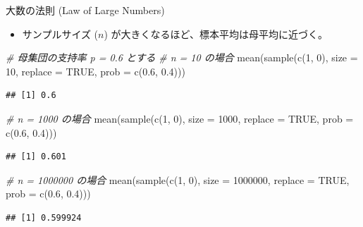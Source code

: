 \documentclass[
  ignorenonframetext,
]{beamer}
\newenvironment{Shaded}{\begin{snugshade}}{\end{snugshade}}
\newcommand{\AttributeTok}[1]{\textcolor[rgb]{0.77,0.63,0.00}{#1}}
\newcommand{\CommentTok}[1]{\textcolor[rgb]{0.56,0.35,0.01}{\textit{#1}}}
\newcommand{\ConstantTok}[1]{\textcolor[rgb]{0.00,0.00,0.00}{#1}}
\newcommand{\DecValTok}[1]{\textcolor[rgb]{0.00,0.00,0.81}{#1}}
\newcommand{\FloatTok}[1]{\textcolor[rgb]{0.00,0.00,0.81}{#1}}
\newcommand{\FunctionTok}[1]{\textcolor[rgb]{0.00,0.00,0.00}{#1}}
\newcommand{\NormalTok}[1]{#1}
\providecommand{\tightlist}{%
  \setlength{\itemsep}{0pt}\setlength{\parskip}{0pt}}
\begin{document}
\begin{frame}[fragile]{大数の法則 (Law of Large Numbers)}
\protect\hypertarget{ux5927ux6570ux306eux6cd5ux5247-law-of-large-numbers}{}
\begin{itemize}
\tightlist
\item
  サンプルサイズ (\(n\)) が大きくなるほど、標本平均は母平均に近づく。
\end{itemize}

\scriptsize

\begin{Shaded}
\begin{Highlighting}[]
\CommentTok{\# 母集団の支持率 p = 0.6 とする}
\CommentTok{\# n = 10 の場合}
\FunctionTok{mean}\NormalTok{(}\FunctionTok{sample}\NormalTok{(}\FunctionTok{c}\NormalTok{(}\DecValTok{1}\NormalTok{, }\DecValTok{0}\NormalTok{), }\AttributeTok{size =} \DecValTok{10}\NormalTok{, }\AttributeTok{replace =} \ConstantTok{TRUE}\NormalTok{, }
            \AttributeTok{prob =} \FunctionTok{c}\NormalTok{(}\FloatTok{0.6}\NormalTok{, }\FloatTok{0.4}\NormalTok{)))}
\end{Highlighting}
\end{Shaded}

\begin{verbatim}
## [1] 0.6
\end{verbatim}

\begin{Shaded}
\begin{Highlighting}[]
\CommentTok{\# n = 1000 の場合}
\FunctionTok{mean}\NormalTok{(}\FunctionTok{sample}\NormalTok{(}\FunctionTok{c}\NormalTok{(}\DecValTok{1}\NormalTok{, }\DecValTok{0}\NormalTok{), }\AttributeTok{size =} \DecValTok{1000}\NormalTok{, }\AttributeTok{replace =} \ConstantTok{TRUE}\NormalTok{,}
            \AttributeTok{prob =} \FunctionTok{c}\NormalTok{(}\FloatTok{0.6}\NormalTok{, }\FloatTok{0.4}\NormalTok{)))}
\end{Highlighting}
\end{Shaded}

\begin{verbatim}
## [1] 0.601
\end{verbatim}

\begin{Shaded}
\begin{Highlighting}[]
\CommentTok{\# n = 1000000 の場合}
\FunctionTok{mean}\NormalTok{(}\FunctionTok{sample}\NormalTok{(}\FunctionTok{c}\NormalTok{(}\DecValTok{1}\NormalTok{, }\DecValTok{0}\NormalTok{), }\AttributeTok{size =} \DecValTok{1000000}\NormalTok{, }\AttributeTok{replace =} \ConstantTok{TRUE}\NormalTok{, }
            \AttributeTok{prob =} \FunctionTok{c}\NormalTok{(}\FloatTok{0.6}\NormalTok{, }\FloatTok{0.4}\NormalTok{)))}
\end{Highlighting}
\end{Shaded}

\begin{verbatim}
## [1] 0.599924
\end{verbatim}

\normalsize
\end{frame}
\end{document}

